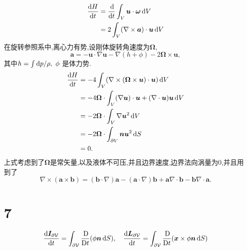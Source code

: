 \documentclass[12pt]{article}
\begin{document}
\begin{equation}
	\begin{aligned}
	\frac{\dif H}{\dif t} &=\frac{\dif}{\dif t} \int_V \bm{u} \cdot \bm{\omega} \dif V \\
	&=2\int _V (\nabla \times \bm{a}) \cdot \bm{u} \dif V
	\end{aligned}
\end{equation}
在旋转参照系中,离心力有势,设刚体旋转角速度为$\bm{\Omega}$,
\begin{equation}
	\bm{a} = - \bm{u} \cdot \nabla \bm{u} - \nabla (h+\phi) - 2 \bm{\Omega} \times \bm{u},
\end{equation}
其中$h=\int \dif p/\rho,\ \phi$ 是体力势.
\begin{equation}
	\begin{aligned}
		\frac{\dif H}{\dif t} &=-4\int _V (\nabla \times (\bm{\Omega} \times \bm{u}) \cdot \bm{u}) \dif V\\
		&=-4 \bm{\Omega} \cdot \int _V (\nabla \bm{u}) \cdot \bm{u}+(\nabla \cdot \bm{u}) \bm{u} \dif V\\
		&=-2 \bm{\Omega} \cdot \int _V \nabla \bm{u}^2 \dif V\\
		&=-2 \bm{\Omega} \cdot \int_{\partial V} \bm{n} \bm{u}^2 \dif S\\
		&=0.
	\end{aligned}
\end{equation}
上式考虑到了$\bm{\Omega}$是常矢量,以及液体不可压,并且边界速度,边界法向涡量为$0$,并且用到了
\begin{equation}
	\nabla \times (\bm{a}\times \bm{b}) = (\bm{b} \cdot \nabla) \bm{a} - (\bm{a}\cdot\nabla)\bm{b}+\bm{a} \nabla \cdot \bm{b} - \bm{b} \nabla \cdot \bm{a}.
\end{equation}

\section{7}

\begin{equation}
	\frac{\dif \boldsymbol{I}_{\partial \mathcal{V}}}{\dif t}=\int_{\partial \mathcal{V}} \frac{\Dif}{\Dif t}(\phi \boldsymbol{n} \dif S), \quad \frac{\dif \boldsymbol{L}_{\partial \mathcal{V}}}{\dif t}=\int_{\partial \mathcal{V}} \frac{\Dif}{\Dif t}(\boldsymbol{x} \times \phi \boldsymbol{n} \dif S)
\end{equation}
\end{document}
